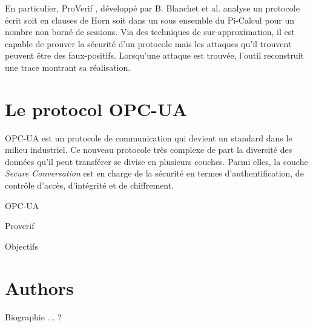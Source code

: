 \documentclass{article}
\newcommand{\proverif}{ProVerif}
\begin{document}
En particulier, \proverif{} \cite{Bla01,PROVERIF14_manual}, développé par B. Blanchet et al. analyse un protocole écrit
soit en clauses de Horn soit dans un sous ensemble du Pi-Calcul pour un nombre non borné
de sessions.
Via des techniques de sur-approximation, il est capable de prouver la sécurité d'un protocole
mais les attaques qu'il trouvent peuvent être des faux-positifs.
Lorsqu'une attaque est trouvée, l'outil reconstruit une trace montrant sa réalisation.

\section{Le protocol OPC-UA}

OPC-UA \cite{opc-ua} est un protocole de communication qui devient un standard dans le milieu industriel.
Ce nouveau protocole très complexe de part la diversité des données qu'il peut transférer
se divise en plusieurs couches. 
Parmi elles, la couche {\em Secure Conversation} est en charge de la sécurité en termes d'authentification,
de contrôle d'accès, d'intégrité et de chiffrement.

OPC-UA

Proverif

Objectifs

\section{Authors}

Biographie ... ?
\end{document}
